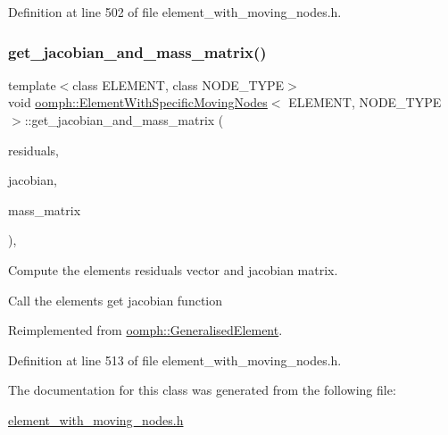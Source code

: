 Definition at line 502 of file element\+\_\+with\+\_\+moving\+\_\+nodes.\+h.

\mbox{\label{classoomph_1_1ElementWithSpecificMovingNodes_a02faf26f26815b4315d6ae82ff00da4c}} 
\subsubsection{\texorpdfstring{get\+\_\+jacobian\+\_\+and\+\_\+mass\+\_\+matrix()}{get\_jacobian\_and\_mass\_matrix()}}
{\footnotesize\ttfamily template$<$class E\+L\+E\+M\+E\+NT, class N\+O\+D\+E\+\_\+\+T\+Y\+PE$>$ \\
void \hyperlink{classoomph_1_1ElementWithSpecificMovingNodes}{oomph\+::\+Element\+With\+Specific\+Moving\+Nodes}$<$ E\+L\+E\+M\+E\+NT, N\+O\+D\+E\+\_\+\+T\+Y\+PE $>$\+::get\+\_\+jacobian\+\_\+and\+\_\+mass\+\_\+matrix (\begin{DoxyParamCaption}\item[{\hyperlink{classoomph_1_1Vector}{Vector}$<$ double $>$ \&}]{residuals,  }\item[{\hyperlink{classoomph_1_1DenseMatrix}{Dense\+Matrix}$<$ double $>$ \&}]{jacobian,  }\item[{\hyperlink{classoomph_1_1DenseMatrix}{Dense\+Matrix}$<$ double $>$ \&}]{mass\+\_\+matrix }\end{DoxyParamCaption})\hspace{0.3cm}{\ttfamily [inline]}, {\ttfamily [virtual]}}



Compute the element\textquotesingle{}s residuals vector and jacobian matrix. 

Call the element\textquotesingle{}s get jacobian function 

Reimplemented from \hyperlink{classoomph_1_1GeneralisedElement_acd153d7425b92936314100a7b7354bdc}{oomph\+::\+Generalised\+Element}.



Definition at line 513 of file element\+\_\+with\+\_\+moving\+\_\+nodes.\+h.



The documentation for this class was generated from the following file\+:\begin{DoxyCompactItemize}
\item 
\hyperlink{element__with__moving__nodes_8h}{element\+\_\+with\+\_\+moving\+\_\+nodes.\+h}\end{DoxyCompactItemize}
